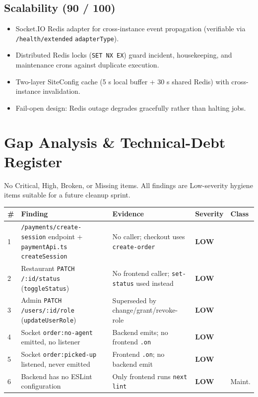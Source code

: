 \documentclass[11pt,a4paper]{article}
\newcommand{\bdead}{\badge[muted]{DEAD CODE}}
\newcommand{\cellmuted}[1]{\cellcolor{muted!15}\textbf{\color{muted}#1}}
\newcommand{\th}[1]{\textbf{\color{white}#1}}
\begin{document}
\subsection{Scalability (90 / 100)}
\begin{itemize}[leftmargin=1.4em,nosep]
  \item Socket.IO Redis adapter for cross-instance event propagation (verifiable via \texttt{/health/extended} \texttt{adapterType}).
  \item Distributed Redis locks (\texttt{SET NX EX}) guard incident, housekeeping, and maintenance crons against duplicate execution.
  \item Two-layer SiteConfig cache (5 s local buffer + 30 s shared Redis) with cross-instance invalidation.
  \item Fail-open design: Redis outage degrades gracefully rather than halting jobs.
\end{itemize}

\newpage

\section{Gap Analysis \& Technical-Debt Register}

No Critical, High, Broken, or Missing items.  All findings are Low-severity
hygiene items suitable for a future cleanup sprint.

\begin{center}\footnotesize
\begin{longtable}{p{0.5cm}p{5.2cm}p{4.8cm}p{1.6cm}p{1.3cm}}
\toprule
\rowcolor{headbg}\th{\#} & \th{Finding} & \th{Evidence} & \th{Severity} & \th{Class} \\
\midrule
\endhead
1 & \texttt{/payments/create-session} endpoint + \texttt{paymentApi.ts} \texttt{createSession} & No caller; checkout uses \texttt{create-order} & \cellmuted{LOW} & \bdead \\
\rowcolor{rowalt}2 & Restaurant \texttt{PATCH /:id/status} (\texttt{toggleStatus}) & No frontend caller; \texttt{set-status} used instead & \cellmuted{LOW} & \bdead \\
3 & Admin \texttt{PATCH /users/:id/role} (\texttt{updateUserRole}) & Superseded by change/grant/revoke-role & \cellmuted{LOW} & \bdead \\
\rowcolor{rowalt}4 & Socket \texttt{order:no-agent} emitted, no listener & Backend emits; no frontend \texttt{.on} & \cellmuted{LOW} & \bdead \\
5 & Socket \texttt{order:picked-up} listened, never emitted & Frontend \texttt{.on}; no backend emit & \cellmuted{LOW} & \bdead \\
\rowcolor{rowalt}6 & Backend has no ESLint configuration & Only frontend runs \texttt{next lint} & \cellmuted{LOW} & Maint. \\
\bottomrule
\end{longtable}
\end{center}
\end{document}
